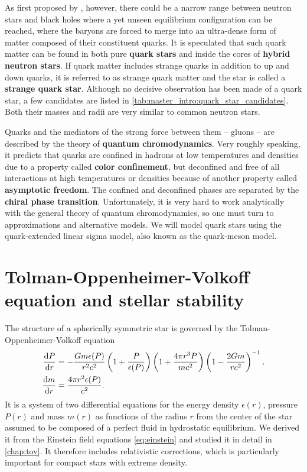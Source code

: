 As first proposed by \cite{ref:quark_star_proposition_1}, however,
there could be a narrow range between neutron stars and black holes where a yet unseen equilibrium configuration can be reached,
where the baryons are forced to merge into an ultra-dense form of matter composed of their constituent quarks.
It is speculated that such quark matter can be found in both pure \textbf{quark stars} and inside the cores of \textbf{hybrid neutron stars}.
If quark matter includes strange quarks in addition to up and down quarks, it is referred to as strange quark matter and the star is called a \textbf{strange quark star}.
Although no decisive observation has been made of a quark star,
a few candidates are listed in \cref{tab:master_intro:quark_star_candidates}.
Both their masses and radii are very similar to common neutron stars.

Quarks and the mediators of the strong force between them -- gluons -- are described by the theory of \textbf{quantum chromodynamics}.
Very roughly speaking, it predicts that quarks are confined in hadrons at low temperatures and densities due to a property called \textbf{color confinement},
but deconfined and free of all interactions at high temperatures or densities because of another property called \textbf{asymptotic freedom}.
The confined and deconfined phases are separated by the \textbf{chiral phase transition}.
Unfortunately, it is very hard to work analytically with the general theory of quantum chromodynamics,
so one must turn to approximations and alternative models.
We will model quark stars using the quark-extended linear sigma model, also known as the quark-meson model.


\section{Tolman-Oppenheimer-Volkoff equation and stellar stability}
\label{sec:master_intro:tov}

The structure of a spherically symmetric star is governed by the Tolman-Oppenheimer-Volkoff equation
\begin{subequations}
\begin{align}
	\odv{P}{r} &= -\frac{G m \epsilon(P)}{r^2 c^2} \left( 1 + \frac{P}{\epsilon(P)} \right) \left( 1 + \frac{4 \pi r^3 P}{m c^2} \right) \left( 1 - \frac{2 G m}{r c^2} \right)^{-1} , \\
	\odv{m}{r} &= \frac{4 \pi r^2 \epsilon(P)}{c^2} .
\end{align}%
\label{eq:master_intro:tov}%
\end{subequations}%
It is a system of two differential equations for the energy density $\epsilon(r)$, pressure $P(r)$ and mass $m(r)$ as functions of the radius $r$ from the center of the star assumed to be composed of a perfect fluid in hydrostatic equilibrium.
We derived it from the Einstein field equations \eqref{eq:einstein} and studied it in detail in \cref{chap:tov}.
It therefore includes relativistic corrections, which is particularly important for compact stars with extreme density.

